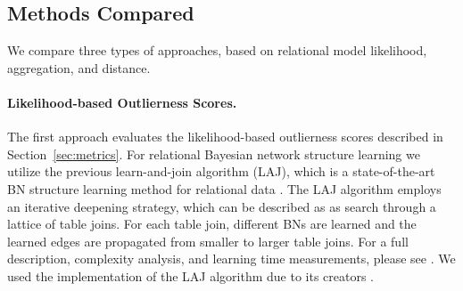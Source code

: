 {					%
					
					\subsection{Methods Compared}
					\label{sec:methods}
					We compare three types of approaches, based on relational model likelihood, aggregation, and distance. 
					
\paragraph{Likelihood-based Outlierness Scores.} The first approach evaluates the likelihood-based outlierness scores described in Section~\ref{sec:metrics}. For relational Bayesian network structure learning we utilize the previous learn-and-join algorithm (LAJ), which is
a state-of-the-art BN structure learning method for relational data \citep{Schulte2012}. The LAJ algorithm employs an iterative deepening strategy, which can be described as as search through a lattice of table joins. For each table join, different BNs are learned and the learned edges are propagated from smaller to larger table joins. 	For a full description, complexity analysis, and learning time measurements, please see \citep{Schulte2012}. 	We used the implementation of the LAJ algorithm due to its creators \citep{bib:jbnsite}. 
%
					
}
